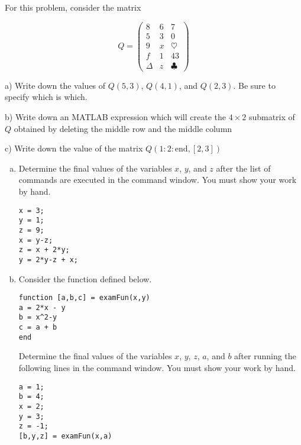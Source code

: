 \documentclass[11pt]{exam}
\theoremstyle{definition}
\begin{document}
\begin{questions}

\addpoints

\question[10]\mbox{}

For this problem, consider the matrix

$$Q = \left(\begin{array}{ccc}
  8 &  6 & 7\\
  5 &  3 & 0\\
  9 &  x & \heartsuit\\
  f &  1 & 43\\
 \Delta & z &  \clubsuit
\end{array}\right)$$

a) Write down the values of $Q(5,3)$, $Q(4,1)$, and $Q(2,3)$.  Be sure to specify which is which.

b) Write down an MATLAB expression which will create the $4\times 2$ submatrix of $Q$ obtained by deleting the middle row and the middle column

c) Write down the value of the matrix $Q(1:2:\text{end},[2,3])$

\newpage
\question[10]\mbox{}

\begin{enumerate}[(a)]
\item Determine the final values of the variables $x$, $y$, and $z$ after the list of commands are executed in the command window.
You must show your work by hand.

\begin{lstlisting}
x = 3;
y = 1;
z = 9;
x = y-z;
z = x + 2*y;
y = 2*y-z + x;
\end{lstlisting}

\vspace{2in}
\item Consider the function defined below.

\begin{lstlisting}
function [a,b,c] = examFun(x,y)
a = 2*x - y
b = x^2-y
c = a + b
end
\end{lstlisting}

Determine the final values of the variables $x$, $y$, $z$, $a$, and $b$ after running the following lines in the command window.  You must show your work by hand.

\begin{lstlisting}
a = 1;
b = 4;
x = 2;
y = 3;
z = -1;
[b,y,z] = examFun(x,a)
\end{lstlisting}

\end{enumerate}


\end{questions}
\end{document}
